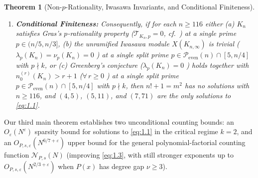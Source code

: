 \documentclass[11pt,reqno]{amsart}
\newtheorem{theorem}{Theorem}[section]
\theoremstyle{remark}
\numberwithin{equation}{section}
\newcommand{\Peven}{\mathcal{P}_{\mathrm{even}}}
\begin{document}
\begin{theorem}[{Non-$p$-Rationality, Iwasawa Invariants, and Conditional Finiteness}]
\begin{enumerate}
\item[(iii)] \textbf{Conditional Finiteness:} Consequently, if for each $n \ge 116$ either \textup{(a)} $K_n$ satisfies Gras's $p$-rationality property ($\mathcal{T}_{K_n, p} = 0$, cf.\ \cite{Gras2016}) at a single prime $p \in (n/5, n/3]$, \textup{(b)} the unramified Iwasawa module $X(K_{n,\infty})$ is trivial ($\lambda_p(K_n) = \nu_p(K_n) = 0$ \cite{FukudaKomatsu1986,Jaulent2024,Yanagisawa2026}) at a single split prime $p \in \Peven(n) \cap [5, n/4]$ with $p \nmid k$, or \textup{(c)} Greenberg's conjecture ($\lambda_p(K_n) = 0$ \cite{Greenberg1976}) holds together with $n_0^{(r)}(K_n) > r + 1$ ($\forall\, r \ge 0$ \cite{Taya1996}) at a single split prime $p \in \Peven(n) \cap [5, n/4]$ with $p \nmid k$, then $n! + 1 = m^2$ has no solutions with $n \ge 116$, and $(4, 5)$, $(5, 11)$, and $(7, 71)$ are the only solutions to \eqref{eq:1.1}.
\end{enumerate}
\end{theorem}

Our third main theorem establishes two unconditional counting bounds: an $O_\varepsilon(N^\varepsilon)$ sparsity bound for solutions to \eqref{eq:1.1} in the critical regime $k = 2$, and an $O_{P,s,\varepsilon}(N^{6/7+\varepsilon})$ upper bound for the general polynomial-factorial counting function $\mathcal{N}_{P,s}(N)$ (improving \eqref{eq:1.3}, with still stronger exponents up to $O_{P,s,\varepsilon}(N^{2/3+\varepsilon})$ when $P(x)$ has degree gap $\nu \ge 3$).
\end{document}
